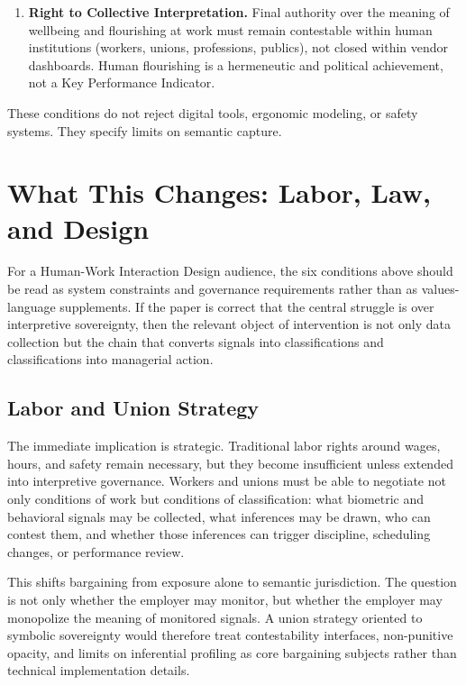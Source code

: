 \documentclass[runningheads]{llncs}
\begin{document}
\begin{enumerate}
\item \textbf{Right to Collective Interpretation.} Final authority over the meaning of wellbeing and flourishing at work must remain contestable within human institutions (workers, unions, professions, publics), not closed within vendor dashboards. Human flourishing is a hermeneutic and political achievement, not a Key Performance Indicator.
\end{enumerate}

These conditions do not reject digital tools, ergonomic modeling, or safety systems. They specify limits on semantic capture.

\section{What This Changes: Labor, Law, and Design}

For a Human-Work Interaction Design audience, the six conditions above should be read as system constraints and governance requirements rather than as values-language supplements. If the paper is correct that the central struggle is over interpretive sovereignty, then the relevant object of intervention is not only data collection but the chain that converts signals into classifications and classifications into managerial action.

\subsection{Labor and Union Strategy}

The immediate implication is strategic. Traditional labor rights around wages, hours, and safety remain necessary, but they become insufficient unless extended into interpretive governance. Workers and unions must be able to negotiate not only conditions of work but conditions of classification: what biometric and behavioral signals may be collected, what inferences may be drawn, who can contest them, and whether those inferences can trigger discipline, scheduling changes, or performance review.

This shifts bargaining from exposure alone to semantic jurisdiction. The question is not only whether the employer may monitor, but whether the employer may monopolize the meaning of monitored signals. A union strategy oriented to symbolic sovereignty would therefore treat contestability interfaces, non-punitive opacity, and limits on inferential profiling as core bargaining subjects rather than technical implementation details.
\end{document}
